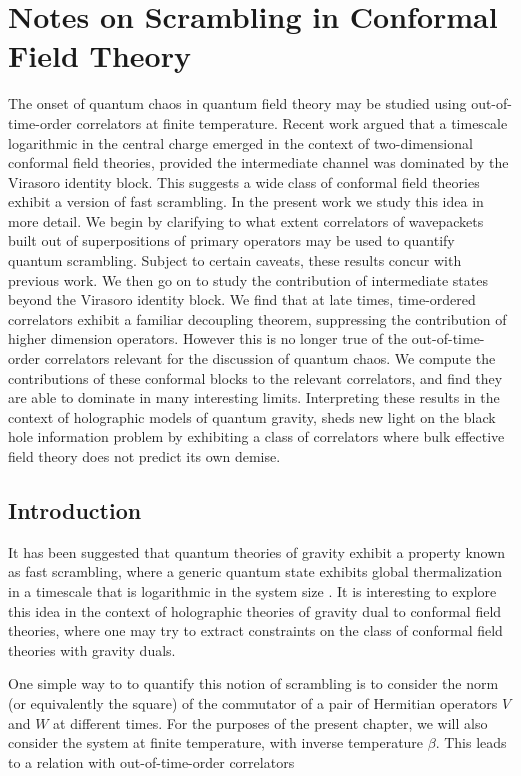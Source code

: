 \documentclass{brownthesis}
\begin{document}
\chapter{Notes on Scrambling in Conformal Field Theory}\label{chap:chaos}
The onset of quantum chaos in quantum field theory may be studied
using out-of-time-order correlators at finite temperature. Recent
work argued that a timescale logarithmic in the central charge emerged
in the context of two-dimensional conformal field theories, provided
the intermediate channel was dominated by the Virasoro identity block.
This suggests a wide class of conformal field theories exhibit a version
of fast scrambling. In the present work we study this idea in more
detail. We begin by clarifying to what extent correlators of wavepackets
built out of superpositions of primary operators may be used to quantify
quantum scrambling. Subject to certain caveats, these results concur
with previous work. We then go on to study the contribution of intermediate
states beyond the Virasoro identity block. We find that at late times,
time-ordered correlators exhibit a familiar decoupling theorem, suppressing
the contribution of higher dimension operators. However this is no
longer true of the out-of-time-order correlators relevant for the
discussion of quantum chaos. We compute the contributions of these
conformal blocks to the relevant correlators, and find they are able
to dominate in many interesting limits. Interpreting these results
in the context of holographic models of quantum gravity, sheds new
light on the black hole information problem by exhibiting a class
of correlators where bulk effective field theory does not predict
its own demise.

\section{Introduction}

It has been suggested that quantum theories of gravity exhibit a property
known as fast scrambling, where a generic quantum state exhibits global
thermalization in a timescale that is logarithmic in the system size
\cite{Sekino:2008he}. It is interesting to explore this idea in
the context of holographic theories of gravity dual to conformal field
theories, where one may try to extract constraints on the class of
conformal field theories with gravity duals.

One simple way to to quantify this notion of scrambling is to consider
the norm (or equivalently the square) of the commutator of a pair
of Hermitian operators $V$ and $W$ at different times. For the purposes
of the present chapter, we will also consider the system at finite temperature,
with inverse temperature $\beta$. This leads to a relation with out-of-time-order
correlators
\end{document}
